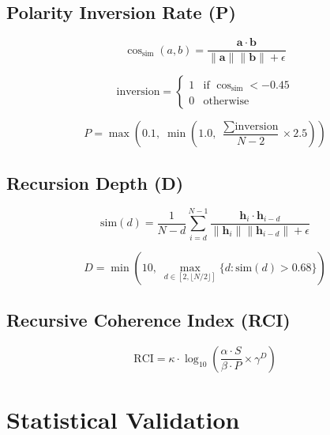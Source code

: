 \documentclass[12pt,a4paper]{article}
\begin{document}
\subsection{Polarity Inversion Rate (P)}

\begin{equation}
\cos_{\text{sim}}(a,b) = \frac{\mathbf{a} \cdot \mathbf{b}}{\|\mathbf{a}\| \|\mathbf{b}\| + \epsilon}
\end{equation}

\begin{equation}
\text{inversion} = \begin{cases}
1 & \text{if } \cos_{\text{sim}} < -0.45 \\
0 & \text{otherwise}
\end{cases}
\end{equation}

\begin{equation}
P = \max\left(0.1,\; \min\left(1.0,\; \frac{\sum \text{inversion}}{N-2} \times 2.5\right)\right)
\end{equation}

\subsection{Recursion Depth (D)}

\begin{equation}
\text{sim}(d) = \frac{1}{N-d} \sum_{i=d}^{N-1} \frac{\mathbf{h}_i \cdot \mathbf{h}_{i-d}}{\|\mathbf{h}_i\| \|\mathbf{h}_{i-d}\| + \epsilon}
\end{equation}

\begin{equation}
D = \min\left(10,\; \max_{d \in [2, \lfloor N/2 \rfloor]} \{ d : \text{sim}(d) > 0.68 \}\right)
\end{equation}

\subsection{Recursive Coherence Index (RCI)}

\begin{equation}
\boxed{\text{RCI} = \kappa \cdot \log_{10}\left( \frac{\alpha \cdot S}{\beta \cdot P} \times \gamma^{D} \right)}
\end{equation}

\section{Statistical Validation}
\end{document}
